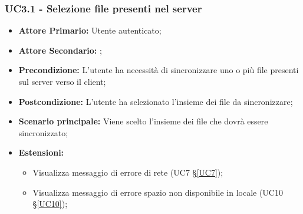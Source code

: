 \subsubsection{UC3.1 - Selezione file presenti nel server}
\label{UC3.1}
\begin{itemize}
\item \textbf{Attore Primario:} Utente autenticato;
\item \textbf{Attore Secondario:} ;
\item \textbf{Precondizione:} L'utente ha necessità di sincronizzare uno o più file presenti sul server verso il client;
\item \textbf{Postcondizione:} L'utente ha selezionato l'insieme dei file da sincronizzare;
\item \textbf{Scenario principale:} Viene scelto l'insieme dei file che dovrà essere sincronizzato;
\item \textbf{Estensioni:}
    \begin{itemize}
    \item Visualizza messaggio di errore di rete (UC7 \S{}\ref{UC7});
    \item Visualizza messaggio di errore spazio non disponibile in locale (UC10 \S{}\ref{UC10});
    \end{itemize}
\end{itemize}